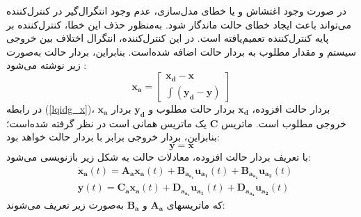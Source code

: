 در صورت وجود اغتشاش و یا خطای مدل‌سازی، عدم وجود انتگرال‌گیر در کنترل‌کننده
 می‌تواند باعث ایجاد خطای حالت ماندگار شود. به‌منظور حذف این خطا، کنترل‌کننده
 بر پایه کنترل‌کننده
 تعمیم‌یافته است. در این کنترل‌کننده، انتگرال اختلاف بین خروجی سیستم و مقدار مطلوب به بردار حالت اضافه شده‌است. بنابراین، بردار حالت به‌صورت زیر نوشته می‌شود
 \cite{reza_pordal}:
 \begin{equation}\label{lqidg_x}
 	\boldsymbol{x_a} = \begin{bmatrix}
 		\boldsymbol{x_d} - \boldsymbol{x}\\
 		\displaystyle \int (\boldsymbol{y_d} - \boldsymbol{y})
 	\end{bmatrix}
 \end{equation}
در رابطه
(\ref{lqidg_x})،
$	\boldsymbol{x_a}$
بردار حالت افزوده،
$	\boldsymbol{x_d}$
بردار حالت مطلوب و
$	\boldsymbol{y_d}$
  بردار خروجی مطلوب است. ماتریس
  $	\boldsymbol{C}$
 یک ماتریس همانی است در نظر گرفته شده‌است؛ بنابراین، بردار خروجی برابر با بردار حالت خواهد
بود:
\begin{equation}
	\boldsymbol{y} = \boldsymbol{x}
\end{equation}
با تعریف بردار حالت افزوده، معادلات حالت به شكل زیر بازنویسی می‌شود:
 \begin{equation}\label{systemlqidg}
	\begin{split}
		&\boldsymbol{\dot x_a}(t) = \boldsymbol{A_ax_a}(t) + \boldsymbol{B_{a_{a_1}}u_{a_1}}(t) + \boldsymbol{B_{a_{a_2}}u_{a_2}}(t)%
		\\
		&\boldsymbol{y}(t) = \boldsymbol{C_ax_a}(t) + \boldsymbol{D_{a_{a_1}}u_{a_1}}(t) + \boldsymbol{D_{a_{a_2}}u_{a_2}}(t)
	\end{split}
\end{equation}
که ماتریسهای $\boldsymbol{A_a}$ و $\boldsymbol{B_a}$ به‌صورت زیر تعریف می‌شوند:


